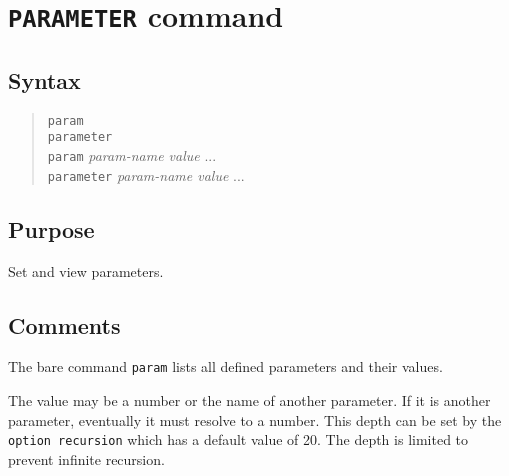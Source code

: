 %
%
%
%
\section{{\tt PARAMETER} command}
\subsection{Syntax}
\begin{verse}
{\tt param}\\
{\tt parameter}\\
{\tt param} {\it param-name value} ... \\
{\tt parameter} {\it param-name value} ...
\end{verse}
\subsection{Purpose}

Set and view parameters.
\subsection{Comments}

The bare command {\tt param} lists all defined parameters and their values.

The value may be a number or the name of another parameter.  If it is
another parameter, eventually it must resolve to a number.  This depth
can be set by the {\tt option recursion} which has a default value of
20.  The depth is limited to prevent infinite recursion.

